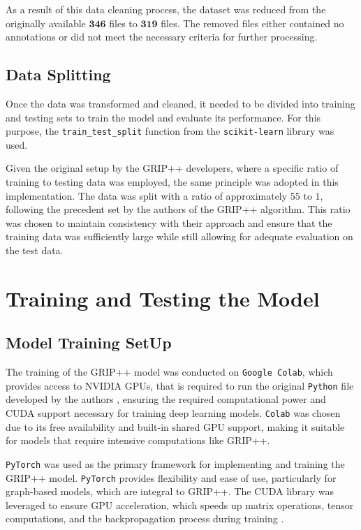 As a result of this data cleaning process, the dataset was reduced from the originally available \(\textbf{346}\) files to \(\textbf{319}\) files. The removed files either contained no annotations or did not meet the necessary criteria for further processing.

\subsection{Data Splitting}

\tab Once the data was transformed and cleaned, it needed to be divided into training and testing sets to train the model and evaluate its performance. For this purpose, the \verb|train_test_split| function from the \verb|scikit-learn| library was used.

Given the original setup by the GRIP++ developers, where a specific ratio of training to testing data was employed, the same principle was adopted in this implementation. The data was split with a ratio of approximately \(55\) to \(1\), following the precedent set by the authors of the GRIP++ algorithm. This ratio was chosen to maintain consistency with their approach and ensure that the training data was sufficiently large while still allowing for adequate evaluation on the test data.


\section{Training and Testing the Model}

\subsection{Model Training SetUp}

\tab The training of the GRIP++ model was conducted on \verb|Google Colab|, which provides access to NVIDIA GPUs, that is required to run the original \verb|Python| file developed by the authors \cite{li2020gripplus}, ensuring the required computational power and CUDA support necessary for training deep learning models. \verb|Colab| was chosen due to its free availability and built-in shared GPU support, making it suitable for models that require intensive computations like GRIP++.

\verb|PyTorch| was used as the primary framework for implementing and training the GRIP++ model. \verb|PyTorch| provides flexibility and ease of use, particularly for graph-based models, which are integral to GRIP++. The CUDA library was leveraged to ensure GPU acceleration, which speeds up matrix operations, tensor computations, and the backpropagation process during training \cite{cuda2024}.

